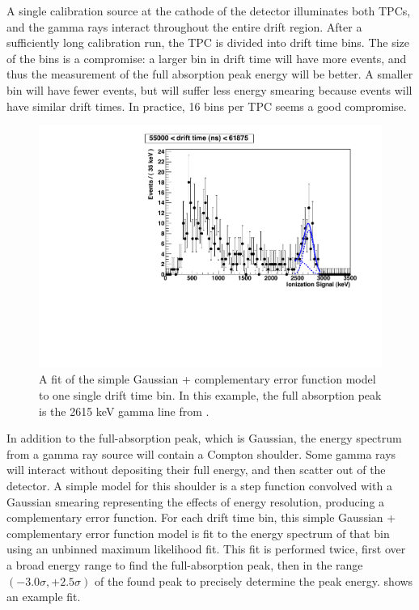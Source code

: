 \documentclass[herrin-thesis.tex]{subfiles}
\begin{document}
A single calibration source at the cathode of the detector illuminates both TPCs, and the gamma rays interact throughout the entire drift region. After a sufficiently long calibration run, the TPC is divided into drift time bins. The size of the bins is a compromise: a larger bin in drift time will have more events, and thus the measurement of the full absorption peak energy will be better. A smaller bin will have fewer events, but will suffer less energy smearing because events will have similar drift times. In practice, 16 bins per TPC seems a good compromise.

\begin{figure}[htbp]
\centering
\includegraphics[width=0.6\columnwidth]{./plots/el_run4034_dt_bin_fit.pdf}
\caption[An example fit in a drift time bin]{A fit of the simple Gaussian + complementary error function model to one single drift time bin. In this example, the full absorption peak is the 2615 keV gamma line from .}
\label{fig:el_dtbinfit}
\end{figure}

In addition to the full-absorption peak, which is Gaussian, the energy spectrum from a gamma ray source will contain a Compton shoulder. Some gamma rays will interact without depositing their full energy, and then scatter out of the detector. A simple model for this shoulder is a step function convolved with a Gaussian smearing representing the effects of energy resolution, producing a complementary error function. For each drift time bin, this simple Gaussian + complementary error function model is fit to the energy spectrum of that bin using an unbinned maximum likelihood fit. This fit is performed twice, first over a broad energy range to find the full-absorption peak, then in the range \((-3.0\sigma, +2.5\sigma)\) of the found peak to precisely determine the peak energy.  shows an example fit.
\end{document}

